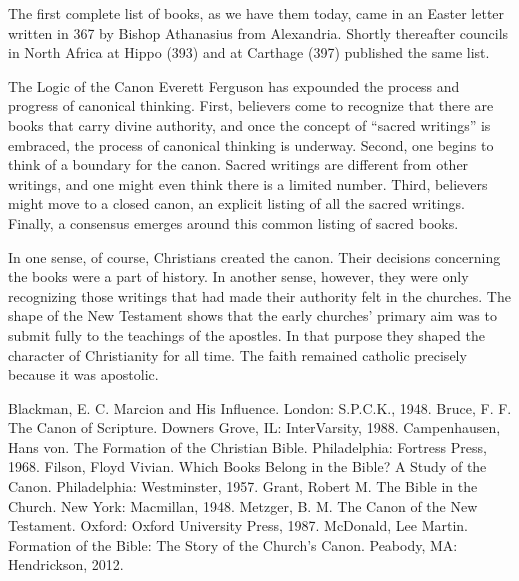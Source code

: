 
The first complete list of books, as we have them today, came in an Easter letter written in 367 by
Bishop Athanasius from Alexandria. Shortly thereafter councils in North Africa at Hippo (393) and at
Carthage (397) published the same list.

\begin{sidebar}{The Logic of the Canon}
Everett Ferguson has expounded the process and progress of canonical thinking. First, believers come
to recognize that there are books that carry divine authority, and once the concept of “sacred
writings” is embraced, the process of canonical thinking is underway. Second, one begins to think of
a boundary for the canon. Sacred writings are different from other writings, and one might even
think there is a limited number. Third, believers might move to a closed canon, an explicit listing
of all the sacred writings. Finally, a consensus emerges around this common listing of sacred books.
\end{sidebar}

In one sense, of course, Christians created the canon. Their decisions concerning the books were a
part of history. In another sense, however, they were only recognizing those writings that had made
their authority felt in the churches. The shape of the New Testament shows that the early churches’
primary aim was to submit fully to the teachings of the apostles. In that purpose they shaped the
character of Christianity for all time. The faith remained catholic precisely because it was
apostolic.

\begin{readinglist}
\entry Blackman, E. C. Marcion and His Influence. London: S.P.C.K., 1948.
\entry Bruce, F. F. The Canon of Scripture. Downers Grove, IL: InterVarsity, 1988.
\entry Campenhausen, Hans von. The Formation of the Christian Bible. Philadelphia: Fortress Press,
  1968.
\entry Filson, Floyd Vivian. Which Books Belong in the Bible? A Study of the Canon. Philadelphia:
  Westminster, 1957.
\entry Grant, Robert M. The Bible in the Church. New York: Macmillan, 1948.
\entry Metzger, B. M. The Canon of the New Testament. Oxford: Oxford University Press, 1987.
\entry *McDonald, Lee Martin. Formation of the Bible: The Story of the Church’s Canon. Peabody, MA:
  Hendrickson, 2012.
\end{readinglist}
